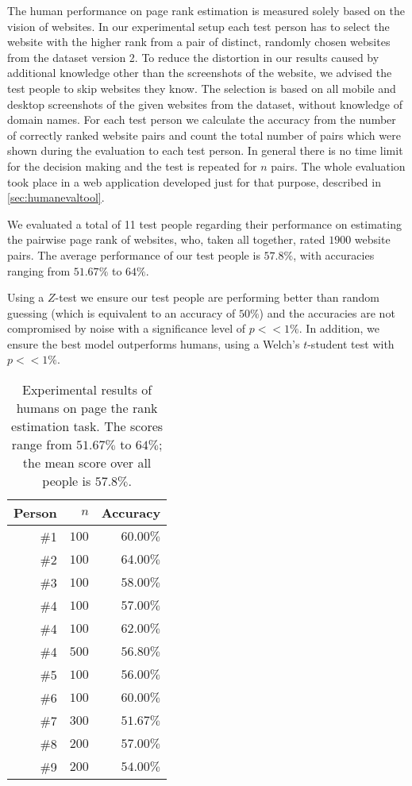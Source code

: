The human performance on page rank estimation is measured solely based on the vision of websites. In our experimental setup each test person has to select the website with the higher rank from a pair of distinct, randomly chosen websites from the dataset version 2. To reduce the distortion in our results caused by additional knowledge other than the screenshots of the website, we advised the test people to skip websites they know. The selection is based on all mobile and desktop screenshots of the given websites from the dataset, without knowledge of domain names.
For each test person we calculate the accuracy from the number of correctly ranked website pairs and count the total number of pairs which were shown during the evaluation to each test person. In general there is no time limit for the decision making and the test is repeated for $n$ pairs.
The whole evaluation took place in a web application developed just for that purpose, described in \ref{sec:humanevaltool}.

We evaluated a total of 11 test people regarding their performance on estimating the pairwise page rank of websites, who, taken all together, rated $1900$ website pairs. The average performance of our test people is $57.8\%$, with accuracies ranging from $51.67\%$ to $64\%$.

Using a $Z$-test we ensure our test people are performing better than random guessing (which is equivalent to an accuracy of $50\%$) and the accuracies are not compromised by noise with a significance level of $p << 1\%$. In addition, we ensure the best model outperforms humans, using a Welch's $t$-student test with $p << 1\%$.

\begin{table}
	\center
	\begin{tabular}{rrr}
		\textbf{Person} & $n$ & \textbf{Accuracy} \\ \hline
		\#1 & $100$ & $60.00\%$\\
		\#2 & $100$ & $64.00\%$\\
		\#3 & $100$ & $58.00\%$\\
        \#4 & $100$ & $57.00\%$\\
        \#4 & $100$ & $62.00\%$\\
        \#4 & $500$ & $56.80\%$\\
		\#5 & $100$ & $56.00\%$\\
		\#6 & $100$ & $60.00\%$\\
		\#7 & $300$ & $51.67\%$\\
		\#8 & $200$ & $57.00\%$\\
		\#9 & $200$ & $54.00\%$\\
	\end{tabular}
	\caption[Experimental results of humans on the page rank estimation task]{Experimental results of humans on page the rank estimation task. The scores range from $51.67\%$ to $64\%$; the mean score over all people is $57.8\%$.}
\label{table_human_eval_results}
\end{table}

